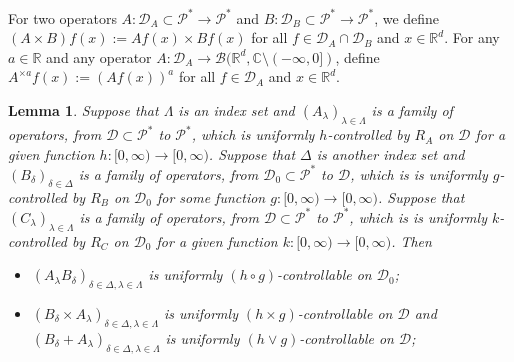 \documentclass[12pt,a4paper]{amsart}
\theoremstyle{plain}
\newtheorem{lem}[thm]{Lemma}
\theoremstyle{definition}
\numberwithin{equation}{section}
\begin{document}
    For two operators $A: \mathcal D_A \subset \mathcal P^*\to \mathcal P^*$ and $B: \mathcal D_B \subset \mathcal P^*\to \mathcal P^*$, we define $(A \times B)f (x):= Af(x) \times Bf(x)$ for all $f\in \mathcal D_A \cap \mathcal D_B$ and $x\in \mathbb{R}^d$.
    For any $a \in \mathbb R$ and any operator $A :\mathcal D_A \to \mathcal B(\mathbb R^d, \mathbb C\setminus (-\infty, 0])$, define $A^{\times a}f(x):= (Af(x))^a$ for all $f\in \mathcal D_A$ and $x\in \mathbb R^d$.
\begin{lem}\label{lem: property of controllable operators}
Suppose that $\Lambda$ is an index set and $(A_\lambda)_{\lambda\in \Lambda}$ is a
family of operators, from $\mathcal D\subset \mathcal P^*$ to $ \mathcal P^*$,
which is uniformly 
$h$-controlled by $R_A$ on $\mathcal D$ for a given function $h:[0,\infty) \to [0, \infty)$.
Suppose that $\Delta$ is another index set and $(B_\delta)_{\delta\in \Delta}$ is a family of operators, from $\mathcal D_0\subset \mathcal P^*$ to $ \mathcal D$,
which is  is uniformly $g$-controlled by $R_B$ on $\mathcal D_0$ 
 for some function $g: [0,\infty) \to [0,\infty)$. Suppose that
 $(C_\lambda)_{\lambda\in \Lambda} $ is a family of operators, from $\mathcal D\subset \mathcal P^*$ to $ \mathcal P^*$,
which is  is uniformly $k$-controlled by $R_C$ on $\mathcal D_0$  
for a given function $k:[0,\infty) \to [0, \infty)$.
 Then 
\begin{itemize}
\item[(1)]
$(A_\lambda B_\delta)_{\delta\in \Delta, \lambda \in \Lambda}$ is uniformly $(h \circ g)$-controllable on $\mathcal D_0$;
\item[(2)]
$(B_\delta\times A_\lambda)_{\delta \in \Delta, \lambda \in \Lambda}$ is uniformly $(h\times g)$-controllable on $\mathcal D$ and $(B_\delta + A_\lambda)_{\delta \in \Delta, \lambda \in \Lambda}$ is uniformly $(h\vee g)$-controllable on $\mathcal D$;

\end{itemize}
\end{lem}
\end{document}
